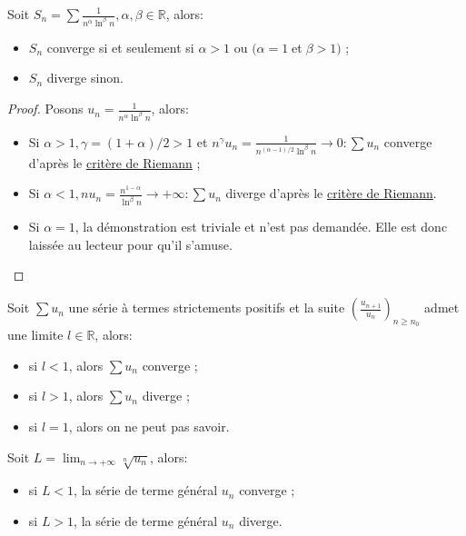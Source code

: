 \documentclass[12pt]{article}
\newenvironment{definition}[2][Définition]{\begin{trivlist}
\item[\hskip \labelsep {\bfseries #1}\hskip \labelsep {\bfseries #2.}]}{\end{trivlist}}
\begin{document}
\bigskip
\begin{definition}{: Séries de Bertrand}
Soit $S_n=\sum\frac{1}{n^\alpha\ln^\beta{n}}, \alpha,\beta \in \mathbb{R}$, alors:
\begin{itemize}
    \item $S_n$ converge si et seulement si $\alpha > 1$ ou $(\alpha = 1 \;$et$\; \beta > 1)$ ;
    \item $S_n$ diverge sinon.
\end{itemize}
\end{definition}
\begin{proof}
 Posons $u_n=\frac{1}{n^\alpha\ln^\beta{n}}$, alors:
 \begin{itemize}
     \item Si $\alpha > 1, \gamma = (1 + \alpha)/2 > 1$ et $n^\gamma u_n = \frac{1}{n^{(\alpha-1)/2}\ln^\beta{n}} \longrightarrow 0 : \sum u_n$ converge d'après le \hyperlink{riemannCritere}{critère de Riemann} ;
     \item Si $\alpha < 1, nu_n = \frac{n^{1-\alpha}}{\ln^\beta{n}}\longrightarrow+\infty:\sum u_n$ diverge d'après le \hyperlink{riemannCritere}{critère de Riemann}.
     \item Si $\alpha = 1$, la démonstration est triviale et n'est pas demandée. Elle est donc laissée au lecteur pour qu'il s'amuse. 
 \end{itemize}
\end{proof}
\bigskip
\begin{definition}{: Test de d'Alembert}
Soit $\sum u_n$ une série à termes strictements positifs et la suite $(\frac{u_{n+1}}{u_n})_{n\ge n_0}$ admet une limite $l\in\mathbb{R}$, alors:
\begin{itemize}
    \item si $l < 1$, alors $\sum u_n$ converge ;
    \item si $l > 1$, alors $\sum u_n$ diverge ;
    \item si $l = 1$, alors on ne peut pas savoir.
\end{itemize}
\end{definition}
\bigskip
\begin{definition}{: Test de Cauchy}
Soit $L=\lim_{n\rightarrow+\infty}\sqrt[n]{u_n}$, alors: 
\begin{itemize}
    \item si $L < 1$, la série de terme général $u_n$ converge ;
    \item si $L > 1$, la série de terme général $u_n$ diverge.
\end{itemize}
\end{definition}
\end{document}
